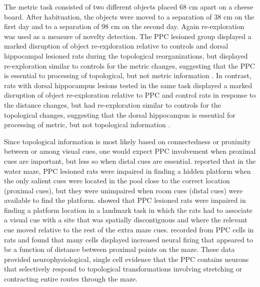 \documentclass[doc, longtable]{apa6}
\begin{document}
The metric task consisted of two different objects placed 68 cm apart on a cheese board. After habituation, the objects were moved to a separation of 38 cm on the first day and to a separation of 98 cm on the second day. Again re-exploration was used as a measure of novelty detection. The PPC lesioned group displayed a marked disruption of object re-exploration relative to controls and dorsal hippocampal lesioned rats during the topological reorganizations, but displayed re-exploration similar to controls for the metric changes, suggesting that the PPC is essential to processing of topological, but not metric information \parencite{Goodrich-Hunsaker2005a}. In contrast, rats with dorsal hippocampus lesions tested in the same task displayed a marked disruption of object re-exploration relative to PPC and control rats in response to the distance changes, but had re-exploration similar to controls for the topological changes, suggesting that the dorsal hippocampus is essential for processing of metric, but not topological information \parencite{goodrich2008interactions, Goodrich-Hunsaker2008b, Goodrich-Hunsaker2005a}. 
	
Since topological information is most likely based on connectedness or proximity between or among visual cues, one would expect PPC involvement when proximal cues are important, but less so when distal cues are essential. \textcite{Save2000a} reported that in the water maze, PPC lesioned rats were impaired in finding a hidden platform when the only salient cues were located in the pool close to the correct location (proximal cues), but they were unimpaired when room cues (distal cues) were available to find the platform. \textcite{Kolb1987a} showed that PPC lesioned rats were impaired in finding a platform location in a landmark task in which the rats had to associate a visual cue with a site that was spatially discontiguous and where the relevant cue moved relative to the rest of the extra maze cues. \textcite{Nitz2006a} recorded from PPC cells in rats and found that many cells displayed increased neural firing that appeared to be a function of distance between proximal points on the maze. These data provided neurophysiological, single cell evidence that the PPC contains neurons that selectively respond to topological transformations involving stretching or contracting entire routes through the maze. 
	
\end{document}
